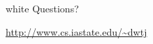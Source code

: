 \begin{frame}
\begin{beamercolorbox}[center]{white}
  {\Large Questions?}

  \vspace{2em}\hfill

  \url{http://www.cs.iastate.edu/~dwtj}
\end{beamercolorbox}
\end{frame}
